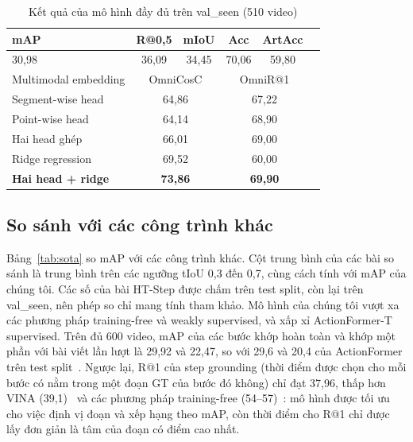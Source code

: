 \documentclass{IEEEtran}
\begin{document}
\begin{table}[t]
\caption{Kết quả của mô hình đầy đủ trên val\_seen (510 video)}
\label{tab:main}
\centering
\setlength{\tabcolsep}{4pt}
\begin{tabular}{|l|c|c|c|c|c|}
\hline
mAP & R@0,5 & mIoU & Acc & ArtAcc & \\
\hline
30,98 & 36,09 & 34,45 & 70,06 & 59,80 & \\
\hline
\hline
Multimodal embedding & \multicolumn{2}{c|}{OmniCosC} & \multicolumn{2}{c|}{OmniR@1} & \\
\hline
Segment-wise head & \multicolumn{2}{c|}{64,86} & \multicolumn{2}{c|}{67,22} & \\
Point-wise head & \multicolumn{2}{c|}{64,14} & \multicolumn{2}{c|}{68,90} & \\
Hai head ghép & \multicolumn{2}{c|}{66,01} & \multicolumn{2}{c|}{69,00} & \\
Ridge regression & \multicolumn{2}{c|}{69,52} & \multicolumn{2}{c|}{60,00} & \\
\textbf{Hai head + ridge} & \multicolumn{2}{c|}{\textbf{73,86}} & \multicolumn{2}{c|}{\textbf{69,90}} & \\
\hline
\end{tabular}
\end{table}

\subsection{So sánh với các công trình khác}
Bảng~\ref{tab:sota} so mAP với các công trình khác. Cột trung bình của các bài so sánh là trung bình trên các ngưỡng tIoU 0,3 đến 0,7, cùng cách tính với mAP của chúng tôi. Các số của bài HT-Step được chấm trên test split, còn lại trên val\_seen, nên phép so chỉ mang tính tham khảo. Mô hình của chúng tôi vượt xa các phương pháp training-free và weakly supervised, và xấp xỉ ActionFormer-T supervised. Trên đủ 600 video, mAP của các bước khớp hoàn toàn và khớp một phần với bài viết lần lượt là 29,92 và 22,47, so với 29,6 và 20,4 của ActionFormer trên test split~\cite{htstep}. Ngược lại, R@1 của step grounding (thời điểm được chọn cho mỗi bước có nằm trong một đoạn GT của bước đó không) chỉ đạt 37,96, thấp hơn VINA (39,1)~\cite{vina} và các phương pháp training-free (54--57)~\cite{baglm,hsd}: mô hình được tối ưu cho việc định vị đoạn và xếp hạng theo mAP, còn thời điểm cho R@1 chỉ được lấy đơn giản là tâm của đoạn có điểm cao nhất.
\end{document}
